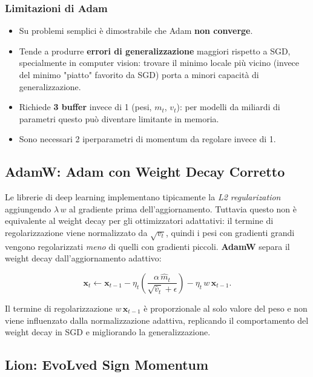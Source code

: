 \subsubsection{Limitazioni di Adam}
\label{subsubsec:adam-limits}

\begin{itemize}
  \item Su problemi semplici è dimostrabile che Adam \textbf{non converge}.
  \item Tende a produrre \textbf{errori di generalizzazione} maggiori rispetto a
        SGD, specialmente in computer vision: trovare il minimo locale più vicino
        (invece del minimo "piatto" favorito da SGD) porta a minori capacità di
        generalizzazione.
  \item Richiede \textbf{3 buffer} invece di 1 (pesi, $m_t$, $v_t$): per modelli
        da miliardi di parametri questo può diventare limitante in memoria.
  \item Sono necessari 2 iperparametri di momentum da regolare invece di 1.
\end{itemize}

\subsection{AdamW: Adam con Weight Decay Corretto}
\label{subsec:adamw}

Le librerie di deep learning implementano tipicamente la \emph{L2
regularization} aggiungendo $\lambda\, w$ al gradiente prima dell'aggiornamento.
Tuttavia questo non è equivalente al weight decay per gli ottimizzatori
adattativi: il termine di regolarizzazione viene normalizzato da $\sqrt{v_t}$,
quindi i pesi con gradienti grandi vengono regolarizzati \emph{meno} di quelli
con gradienti piccoli. \textbf{AdamW} separa il weight decay dall'aggiornamento
adattivo:

\begin{equation}
  \mathbf{x}_t \leftarrow \mathbf{x}_{t-1}
    - \eta_t \left(\frac{\alpha\,\hat{m}_t}{\sqrt{\hat{v}_t} + \epsilon}\right)
    - \eta_t\, w\, \mathbf{x}_{t-1}.
\end{equation}

Il termine di regolarizzazione $w\,\mathbf{x}_{t-1}$ è proporzionale al solo
valore del peso e non viene influenzato dalla normalizzazione adattiva,
replicando il comportamento del weight decay in SGD e migliorando la
generalizzazione.

\subsection{Lion: EvoLved Sign Momentum}
\label{subsec:lion}

